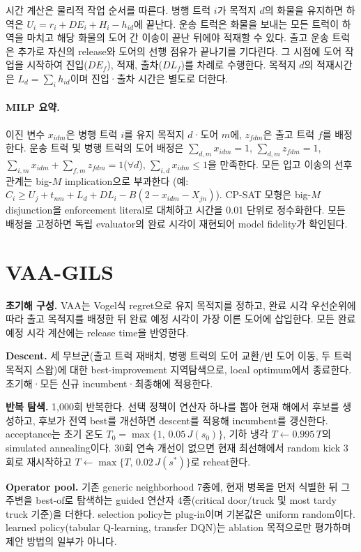 \documentclass[11pt,a4paper]{article}
\begin{document}
시간 계산은 물리적 작업 순서를 따른다. 병행 트럭 $i$가 목적지 $d$의 화물을 유지하면 하역은
$U_i=r_i+DE_i+H_i-h_{id}$에 끝난다. 운송 트럭은 화물을 보내는 모든 트럭이 하역을
마치고 해당 화물의 도어 간 이송이 끝난 뒤에야 적재할 수 있다. 출고 운송 트럭은
추가로 자신의 release와 도어의 선행 점유가 끝나기를 기다린다. 그 시점에 도어 작업을
시작하여 진입($DE_f$), 적재, 출차($DL_f$)를 차례로 수행한다. 목적지 $d$의 적재시간은
$L_d=\sum_i h_{id}$이며 진입·출차 시간은 별도로 더한다.

\paragraph{MILP 요약.} 이진 변수 $x_{idm}$은 병행 트럭 $i$를 유지 목적지
$d$·도어 $m$에, $z_{fdm}$은 출고 트럭 $f$를 배정한다. 운송 트럭 및 병행 트럭의
도어 배정은 $\sum_{d,m}x_{idm}=1$, $\sum_{d,m}z_{fdm}=1$,
$\sum_{i,m}x_{idm}+\sum_{f,m}z_{fdm}=1$($\forall d$), $\sum_{i,d}x_{idm}\le1$을
만족한다. 모든 입고 이송의 선후관계는 big-$M$ implication으로 부과한다
(예: $C_i\ge U_j+t_{nm}+L_d+DL_i-B(2-x_{idm}-X_{jn})$). CP-SAT 모형은 big-$M$
disjunction을 enforcement literal로 대체하고 시간을 0.01 단위로 정수화한다.
모든 배정을 고정하면 독립 evaluator의 완료 시각이 재현되어 model fidelity가
확인된다.

\section{VAA-GILS}

\textbf{초기해 구성.} VAA는 Vogel식 regret으로 유지 목적지를 정하고, 완료 시각
우선순위에 따라 출고 목적지를 배정한 뒤 완료 예정 시각이 가장 이른 도어에 삽입한다.
모든 완료 예정 시각 계산에는 release time을 반영한다.

\textbf{Descent.} 세 무브군(출고 트럭 재배치, 병행 트럭의 도어 교환/빈 도어 이동, 두
트럭 목적지 스왑)에 대한 best-improvement 지역탐색으로, local optimum에서
종료한다. 초기해·모든 신규 incumbent·최종해에 적용한다.

\textbf{반복 탐색.} 1{,}000회 반복한다. 선택 정책이 연산자 하나를
뽑아 현재 해에서 후보를 생성하고, 후보가 전역 best를 개선하면 descent를 적용해
incumbent를 갱신한다. acceptance는 초기 온도 $T_0=\max\{1,\,0.05\,J(s_0)\}$,
기하 냉각 $T\leftarrow0.995\,T$의 simulated annealing이다. 30회 연속 개선이 없으면 현재 최선해에서
random kick 3회로 재시작하고 $T\leftarrow\max\{T,\,0.02\,J(s^*)\}$로 reheat한다.

\textbf{Operator pool.} 기존 generic neighborhood 7종에, 현재 병목을 먼저 식별한
뒤 그 주변을 best-of로 탐색하는 guided 연산자 4종(critical door/truck 및 most
tardy truck 기준)을 더한다. selection policy는 plug-in이며 기본값은 uniform
random이다. learned policy(tabular Q-learning, transfer DQN)는 ablation
목적으로만 평가하며 제안 방법의 일부가 아니다.
\end{document}
